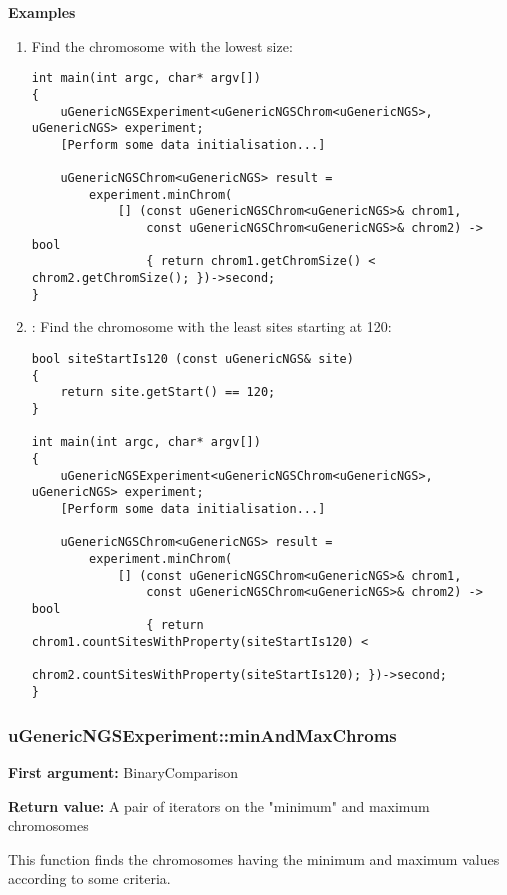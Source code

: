 \documentclass[letterpaper,10pt]{article}
\begin{document}
\bigskip
\noindent{}\textbf{Examples}
\begin{enumerate}
 \item Find the chromosome with the lowest size:
\begin{verbatim}
int main(int argc, char* argv[])
{
    uGenericNGSExperiment<uGenericNGSChrom<uGenericNGS>, uGenericNGS> experiment;
    [Perform some data initialisation...]

    uGenericNGSChrom<uGenericNGS> result = 
        experiment.minChrom(
            [] (const uGenericNGSChrom<uGenericNGS>& chrom1, 
                const uGenericNGSChrom<uGenericNGS>& chrom2) -> bool
                { return chrom1.getChromSize() < chrom2.getChromSize(); })->second;
}
\end{verbatim}

 \item : Find the chromosome with the least sites starting at 120:
\begin{verbatim}
bool siteStartIs120 (const uGenericNGS& site)
{
    return site.getStart() == 120;
}

int main(int argc, char* argv[])
{
    uGenericNGSExperiment<uGenericNGSChrom<uGenericNGS>, uGenericNGS> experiment;
    [Perform some data initialisation...]

    uGenericNGSChrom<uGenericNGS> result = 
        experiment.minChrom(
            [] (const uGenericNGSChrom<uGenericNGS>& chrom1, 
                const uGenericNGSChrom<uGenericNGS>& chrom2) -> bool
                { return chrom1.countSitesWithProperty(siteStartIs120) < 
                         chrom2.countSitesWithProperty(siteStartIs120); })->second;
}
\end{verbatim}
\end{enumerate}

\subsubsection{uGenericNGSExperiment::minAndMaxChroms}
\textbf{First argument:} BinaryComparison

\noindent{}\textbf{Return value:} A pair of iterators on the "minimum" and maximum chromosomes

\bigskip
\noindent{}This function finds the chromosomes having the minimum and maximum values according to some criteria.
\end{document}
